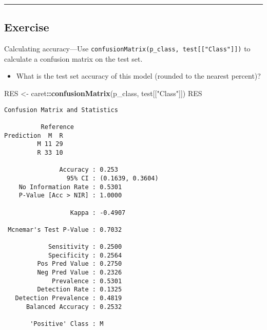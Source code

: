 \documentclass[]{book}
\newenvironment{Shaded}{\begin{snugshade}}{\end{snugshade}}
\newcommand{\KeywordTok}[1]{\textcolor[rgb]{0.13,0.29,0.53}{\textbf{#1}}}
\newcommand{\StringTok}[1]{\textcolor[rgb]{0.31,0.60,0.02}{#1}}
\newcommand{\OperatorTok}[1]{\textcolor[rgb]{0.81,0.36,0.00}{\textbf{#1}}}
\newcommand{\NormalTok}[1]{#1}
\providecommand{\tightlist}{%
  \setlength{\itemsep}{0pt}\setlength{\parskip}{0pt}}
\begin{document}
\begin{center}\rule{0.5\linewidth}{\linethickness}\end{center}

\subsection*{Exercise}\label{exercise-12}

Calculating accuracy---Use
\texttt{confusionMatrix(p\_class,\ test{[}{[}"Class"{]}{]})} to
calculate a confusion matrix on the test set.

\begin{itemize}
\tightlist
\item
  What is the test set accuracy of this model (rounded to the nearest
  percent)?
\end{itemize}

\begin{Shaded}
\begin{Highlighting}[]
\NormalTok{RES <-}\StringTok{ }\NormalTok{caret}\OperatorTok{::}\KeywordTok{confusionMatrix}\NormalTok{(p_class, test[[}\StringTok{"Class"}\NormalTok{]])}
\NormalTok{RES}
\end{Highlighting}
\end{Shaded}

\begin{verbatim}
Confusion Matrix and Statistics

          Reference
Prediction  M  R
         M 11 29
         R 33 10
                                          
               Accuracy : 0.253           
                 95% CI : (0.1639, 0.3604)
    No Information Rate : 0.5301          
    P-Value [Acc > NIR] : 1.0000          
                                          
                  Kappa : -0.4907         
                                          
 Mcnemar's Test P-Value : 0.7032          
                                          
            Sensitivity : 0.2500          
            Specificity : 0.2564          
         Pos Pred Value : 0.2750          
         Neg Pred Value : 0.2326          
             Prevalence : 0.5301          
         Detection Rate : 0.1325          
   Detection Prevalence : 0.4819          
      Balanced Accuracy : 0.2532          
                                          
       'Positive' Class : M               
                                          
\end{verbatim}
\end{document}
